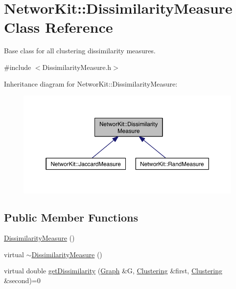 \hypertarget{class_networ_kit_1_1_dissimilarity_measure}{\section{Networ\-Kit\-:\-:Dissimilarity\-Measure Class Reference}
\label{class_networ_kit_1_1_dissimilarity_measure}
}


Base class for all clustering dissimilarity measures.  




{\ttfamily \#include $<$Dissimilarity\-Measure.\-h$>$}



Inheritance diagram for Networ\-Kit\-:\-:Dissimilarity\-Measure\-:\nopagebreak
\begin{figure}[H]
\begin{center}
\leavevmode
\includegraphics[width=350pt]{class_networ_kit_1_1_dissimilarity_measure__inherit__graph}
\end{center}
\end{figure}
\subsection*{Public Member Functions}
\begin{DoxyCompactItemize}
\item 
\hyperlink{class_networ_kit_1_1_dissimilarity_measure_a00af30d7f964ae712384108e86ca679f}{Dissimilarity\-Measure} ()
\item 
virtual \hyperlink{class_networ_kit_1_1_dissimilarity_measure_abcbfd434a7b7176221c9ec8c20c94ee4}{$\sim$\-Dissimilarity\-Measure} ()
\item 
virtual double \hyperlink{class_networ_kit_1_1_dissimilarity_measure_a40a241bd29fac868b3029806ff888366}{get\-Dissimilarity} (\hyperlink{class_networ_kit_1_1_graph}{Graph} \&G, \hyperlink{class_networ_kit_1_1_clustering}{Clustering} \&first, \hyperlink{class_networ_kit_1_1_clustering}{Clustering} \&second)=0
\end{DoxyCompactItemize}


